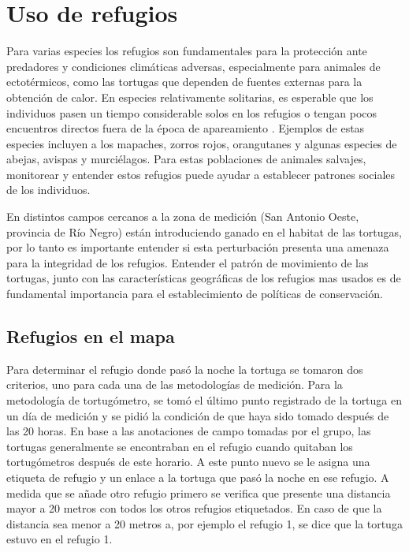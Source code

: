 \chapter{Uso de refugios}
 
 
Para varias especies los refugios son fundamentales para la protección ante predadores y  condiciones climáticas adversas, especialmente para animales de ectotérmicos, como las tortugas que dependen de fuentes externas para la obtención de calor. En especies relativamente solitarias, es esperable que los individuos pasen un tiempo considerable solos en los refugios o tengan pocos encuentros directos fuera de la época de apareamiento \cite{bipartitasTortusPaper}. Ejemplos de estas especies incluyen a los mapaches, zorros rojos, orangutanes y algunas especies de abejas, avispas y murciélagos. Para estas poblaciones de animales salvajes, monitorear y entender estos refugios puede ayudar a establecer patrones sociales de los individuos.
 
En distintos campos cercanos a la zona de medición (San Antonio Oeste, provincia de Río Negro) están introduciendo ganado en el habitat de las tortugas, por lo tanto es importante entender si esta perturbación presenta una amenaza para la integridad de los refugios. Entender el patrón de movimiento  de las tortugas, junto con las características geográficas de los refugios mas usados es de fundamental importancia para el establecimiento de políticas de conservación.
 
\section{Refugios en el mapa}
Para determinar el refugio donde pasó la noche la tortuga se tomaron dos criterios, uno para cada una de las metodologías de medición. Para la metodología de tortugómetro, se tomó el último punto registrado de la tortuga en un día de medición y se pidió la condición de que haya sido tomado después de las 20 horas. En base a las anotaciones de campo tomadas por el grupo, las tortugas generalmente  se encontraban en el refugio cuando quitaban los tortugómetros después de este horario. A este punto nuevo se le asigna una etiqueta de refugio y un enlace a la tortuga que pasó la noche en ese refugio. A medida que se añade otro refugio primero se verifica que presente una distancia mayor a 20 metros con todos los otros refugios etiquetados. En caso de que la distancia sea menor a 20 metros a, por ejemplo el refugio 1, se dice que la tortuga estuvo en el refugio 1.
                  
